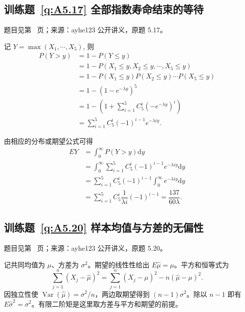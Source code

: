 \subsection*{训练题~\ref{q:A5.17} 全部指数寿命结束的等待}\label{a:A5.17}{\small 题目见第~\pageref{q:A5.17} 页；来源：ayhe123 公开讲义，原题 5.17。}
\begin{solve}
    记 $Y=\max(X_1,\cdots,X_5)$, 则
    \begin{align*}
        P(Y>y) & =1-P(Y\leq y) \\
        & =1-P(X_1\leq y,X_2\leq y,\cdots,X_5\leq y) \\
        & =1-P(X_1\leq y)P(X_2\leq y)\cdots P(X_5\leq y) \\
        & =1-(1-e^{-\lambda y})^5 \\
        & =1-\left(1+\sum\limits_{i=1}^5C_5^i(-e^{-\lambda y})^i\right) \\
        & =\sum\limits_{i=1}^5C_5^i(-1)^{i-1}e^{-\lambda iy}.
    \end{align*}

    由相应的分布或期望公式可得
    \begin{align*}
        EY & =\int_0^\infty P(Y>y)\mathrm{d}y \\
        & =\int_0^\infty\sum\limits_{i=1}^5C_5^i(-1)^{i-1}e^{-\lambda iy}\mathrm{d}y \\
        & =\sum\limits_{i=1}^5C_5^i(-1)^{i-1}\int_0^\infty e^{-\lambda iy}\mathrm{d}y \\
        & =\sum\limits_{i=1}^5C_5^i\dfrac{1}{\lambda i}(-1)^{i-1}=\dfrac{137}{60\lambda}.
    \end{align*}
\end{solve}

\subsection*{训练题~\ref{q:A5.20} 样本均值与方差的无偏性}\label{a:A5.20}{\small 题目见第~\pageref{q:A5.20} 页；来源：ayhe123 公开讲义，原题 5.20。}
\begin{solve}记共同均值为 $\mu$、方差为 $\sigma^2$。期望的线性性给出 $E\widehat\mu=\mu$。平方和恒等式为\[\sum_{j=1}^n(X_j-\widehat\mu)^2=\sum_{j=1}^n(X_j-\mu)^2-n(\widehat\mu-\mu)^2.\]因独立性使 $\operatorname{Var}(\widehat\mu)=\sigma^2/n$，两边取期望得到 $(n-1)\sigma^2$。除以 $n-1$ 即有 $E\widehat\sigma^2=\sigma^2$。有限二阶矩是这里取方差与平方和期望的前提。\end{solve}

